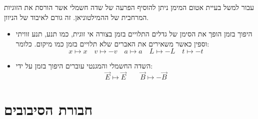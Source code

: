 \documentclass{tstextbook}
\begin{document}
\begin{example}
עבור למשל בעיית אטום המימן ניתן להוסיף הפרעה של שדה חשמלי אשר הורסת את הזוגיות המרחבית של ההמילטוניאן. זה גורם לאיבוד של הניוון.

\end{example}
\begin{summary}
  \begin{itemize}
    \item היפוך בזמן הופך את הסימן של גדלים התלויים בזמן בצורה אי זוגית, כמו תנע, תנע זוויתי וספין כאשר משאירים את האברים שלא תלויים בזמן כמו מיקום. כלומר:
$$x\mapsto x\quad v\mapsto -v\quad a\mapsto a\quad L\mapsto -L\quad t\mapsto-t$$
    \item השדה החשמלי והמגנטי עוברים היפוך בזמן על ידי:
$$\vec{E}\mapsto \vec{E}\qquad \vec{B}\mapsto-\vec{B}$$
  \end{itemize}
\end{summary}

\section{חבורת הסיבובים}
\end{document}
